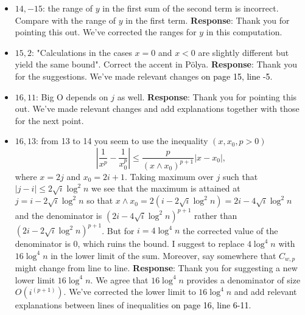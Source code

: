 \documentclass[11pt,a4paper]{article}
\numberwithin{equation}{section}
\newcommand{\abs}[1]{\left\vert #1 \right\vert}
\newcommand{\PL}[2]{\textcolor{black}{on page {#1}, line {#2}}}
\begin{document}
\begin{itemize}
		\item 
		$14,-15$: the range of $y$ in the first sum of the second term is incorrect. Compare with the range of $y$ in the first term.
		\subitem \textbf{Response}: Thank you for pointing this out. We've corrected the ranges for $y$ in this computation.
		
		\item
		$15,2$: "Calculations in the cases $x = 0$ and $x < 0$ are slightly different but yield the same bound". Correct the accent in P\"{o}lya.
		\subitem \textbf{Response}:
		Thank you for the suggestions. We've made relevant changes \PL{15}{-5}.
		
		\item 
		$16,11$: Big O depends on $j$ as well.
		\subitem \textbf{Response}: Thank you for pointing this out. We've made relevant changes and add explanations together with those for the next point.
		
		\item 
		$16,13$: from 13 to 14 you seem to use the inequality $(x, x_0, p > 0)$
		$$
		\abs{\frac{1}{x^p} - \frac{1}{x_0^p}} \leq \frac{p}{\left(x\wedge x_0 \right)^{p+1}} \abs{x-x_0},
		$$
		where $x = 2j$ and $x_0 = 2i + 1$. Taking maximum over $j$ such that $\abs{j-i}\leq  2\sqrt{i} \log^2 n$
		we see that the maximum is attained at $j = i- 2\sqrt{i} \log^2 n$ so that $x\wedge x_0 = 2\left( i- 2\sqrt{i} \log^2 n
		\right) = 2i - 4 \sqrt{i} \log^2 n$
		and the denominator is $(2i - 4\sqrt{i} \log^2 n)^{p+1}$ rather than $(2i-2\sqrt{i} \log^2 n)^{p+1}$. But for $i = 4 \log^4 n$ the corrected
		value of the denominator is $0$, which ruins the bound. I suggest to replace $4 \log^4 n$ with $16 \log^4 n$ in the lower limit of the sum. Moreover, say somewhere that $C_{w,p}$ might change from line to line.
		\subitem \textbf{Response}: Thank you for suggesting a new lower limit $16 \log^4 n $. We agree that $16 \log^4 n$ provides a denominator of size $O\left(i^{(p+1)}\right)$. We've corrected the lower limit to $16\log^4 n$ and add relevant explanations between lines of inequalities \PL{16}{6-11}. 
		

\end{itemize}
\end{document}
